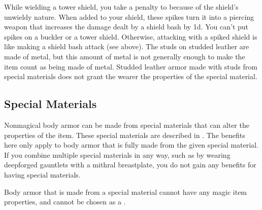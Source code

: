         While wielding a tower shield, you take a  penalty to  because of the shield's unwieldy nature.
         When added to your shield, these spikes turn it into a piercing weapon that increases the damage dealt by a shield bash by \plus1d. You can't put spikes on a buckler or a tower shield. Otherwise, attacking with a spiked shield is like making a shield bash attack (see above).
         The studs on studded leather are made of metal, but this amount of metal is not generally enough to make the item count as being made of metal.
        Studded leather armor made with studs from special materials does not grant the wearer the properties of the special material.

    \subsection{Special Materials}\label{Special Materials}
        Nonmagical body armor can be made from special materials that can alter the properties of the item.
        These special materials are described in .
        The benefits here only apply to body armor that is fully made from the given special material.
        If you combine multiple special materials in any way, such as by wearing deepforged gauntlets with a mithral breastplate, you do not gain any benefits for having special materials.

        Body armor that is made from a special material cannot have any magic item properties, and cannot be chosen as a .

